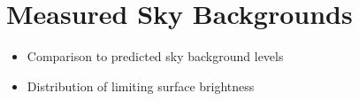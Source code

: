 \section{Measured Sky Backgrounds}
\label{sec:sky_background}

\begin{itemize}
    \item Comparison to predicted sky background levels
    \item Distribution of limiting surface brightness
\end{itemize}